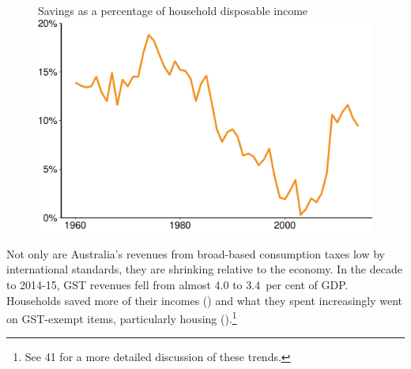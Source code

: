 \begin{figure}[t]
%
{Savings as a percentage of household disposable income}
\includegraphics[width=\columnwidth]{atlas/Households_are_saving_more-1.pdf}
\end{figure}

Not only are Australia’s revenues from broad-based consumption taxes low by international standards, they are shrinking relative to the economy. In the decade to 2014-15, GST revenues fell from almost 4.0 to 3.4~per cent of GDP\@.  Households saved more of their incomes () and what they spent increasingly went on GST-exempt items, particularly housing ().\footnote{See \textcites{Treasury2014-Budget-Papers-2014-15}[][38--41]{PBO2014TrendsAustralianGovtReceipts1982to2013} 41 for a more detailed discussion of these trends.} 

